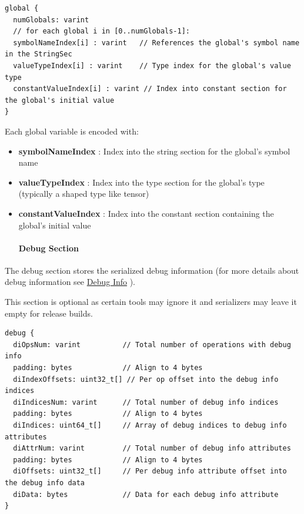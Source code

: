 \documentclass{article}
\begin{document}
\begin{lstlisting}
global {
  numGlobals: varint
  // for each global i in [0..numGlobals-1]:
  symbolNameIndex[i] : varint   // References the global's symbol name in the StringSec
  valueTypeIndex[i] : varint    // Type index for the global's value type
  constantValueIndex[i] : varint // Index into constant section for the global's initial value
}
\end{lstlisting}

Each global variable is encoded with:


\begin{itemize}
\item \textbf{symbolNameIndex} : Index into the string section for the global's symbol name
\item \textbf{valueTypeIndex} : Index into the type section for the global's type (typically a shaped type like tensor)
\item \textbf{constantValueIndex} : Index into the constant section containing the global's initial value


\paragraph{Debug Section}

\end{itemize}
The debug section stores the serialized debug information (for more details about debug information see \href{https://docs.nvidia.com/cuda/tile-ir/latest/sections/debug_info.html#section-debug-info}{Debug Info} ).

This section is optional as certain tools may ignore it and serializers may leave it empty for release builds.


\begin{lstlisting}
debug {
  diOpsNum: varint          // Total number of operations with debug info
  padding: bytes            // Align to 4 bytes
  diIndexOffsets: uint32_t[] // Per op offset into the debug info indices
  diIndicesNum: varint      // Total number of debug info indices
  padding: bytes            // Align to 4 bytes
  diIndices: uint64_t[]     // Array of debug indices to debug info attributes
  diAttrNum: varint         // Total number of debug info attributes
  padding: bytes            // Align to 4 bytes
  diOffsets: uint32_t[]     // Per debug info attribute offset into the debug info data
  diData: bytes             // Data for each debug info attribute
}
\end{lstlisting}
\end{document}
